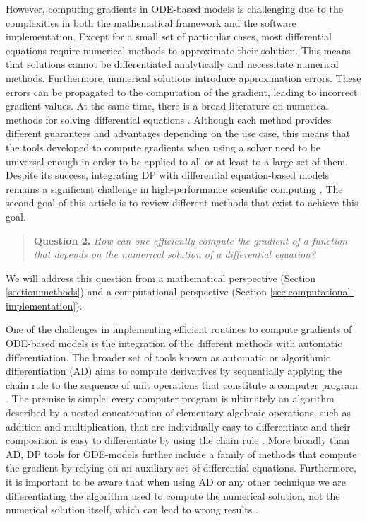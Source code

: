 However, computing gradients in ODE-based models is challenging due to the complexities in both the mathematical framework and the software implementation.
Except for a small set of particular cases, most differential equations require numerical methods to approximate their solution.
This means that solutions cannot be differentiated analytically and necessitate numerical methods. 
Furthermore, numerical solutions introduce approximation errors. 
These errors can be propagated to the computation of the gradient, leading to incorrect gradient values. 
At the same time, there is a broad literature on numerical methods for solving differential equations \cite{hairer-solving-1, hairer-solving-2}. 
Although each method provides different guarantees and advantages depending on the use case, this means that the tools developed to compute gradients when using a solver need to be universal enough in order to be applied to all or at least to a large set of them. 
Despite its success, integrating DP with differential equation-based models remains a significant challenge in high-performance scientific computing \cite{Naumann.2011}.
The second goal of this article is to review different methods that exist to achieve this goal.
\begin{quote}
    \textbf{Question 2. }
    \textit{How can one efficiently compute the gradient of a function that depends on the numerical solution of a differential equation?}
\end{quote}
We will address this question from a mathematical perspective (Section \ref{section:methods}) and a computational perspective (Section \ref{sec:computational-implementation}). 

One of the challenges in implementing efficient routines to compute gradients of ODE-based models is the integration of the different methods with automatic differentiation.
The broader set of tools known as automatic or algorithmic differentiation (AD) aims to compute derivatives by sequentially applying the chain rule to the sequence of unit operations that constitute a computer program \cite{Griewank:2008kh, Naumann.2011}. 
The premise is simple: every computer program is ultimately an algorithm described by a nested concatenation of elementary algebraic operations, such as addition and multiplication, that are individually easy to differentiate and their composition is easy to differentiate by using the chain rule \cite{Giering:1998in}. 
More broadly than AD, DP tools for ODE-models further include a family of methods that compute the gradient by relying on an auxiliary set of differential equations. 
Furthermore, it is important to be aware that when using AD or any other technique we are differentiating the algorithm used to compute the numerical solution, not the numerical solution itself, which can lead to wrong results \cite{Eberhard_Bischof_1996}.


